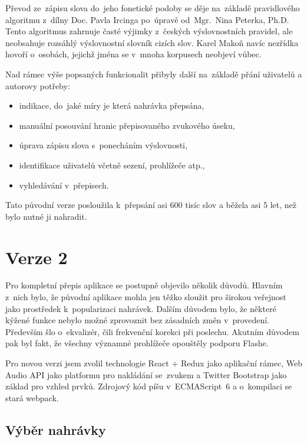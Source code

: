 Převod ze~zápisu slova do~jeho fonetické podoby se děje na~základě pravidlového
algoritmu z~dílny Doc. Pavla Ircinga po~úpravě od~Mgr.~Nina Peterka, Ph.D. Tento
algoritmus zahrnuje časté výjimky z~českých výslovnostních pravidel, ale
neobsahuje rozsáhlý výslovnostní slovník cizích slov. Karel Makoň navíc nezřídka
hovoří o~osobách, jejichž jména se v~mnoha korpusech neobjeví vůbec.

Nad rámec výše popsaných funkcionalit přibyly další na~základě přání uživatelů a
autorovy potřeby:

\begin{itemize}
\item{indikace, do~jaké míry je která nahrávka přepsána,}
\item{manuální posouvání hranic přepisovaného zvukového úseku,}
\item{úprava zápisu slova s~ponecháním výslovnosti,}
\item{identifikace uživatelů včetně sezení, prohlížeče atp.,}
\item{vyhledávání v~přepisech.}
\end{itemize}

Tato původní verze posloužila k~přepsání asi 600 tisíc slov a běžela asi 5 let,
než bylo nutné ji nahradit.

\section{Verze 2}

Pro kompletní přepis aplikace se postupně objevilo několik důvodů. Hlavním
z~nich bylo, že původní aplikace mohla jen těžko sloužit pro širokou veřejnost
jako prostředek k~popularizaci nahrávek. Dalším důvodem bylo, že některé kýžené
funkce nebylo možné zprovoznit bez zásadních změn v~provedení. Především šlo
o~ekvalizér, čili frekvenční korekci při poslechu. Akutním důvodem pak byl fakt,
že všechny významné prohlížeče opouštěly podporu Flashe.

Pro novou verzi jsem zvolil technologie React + Redux\cite{abramov2015redux} jako aplikační rámec, Web
Audio API\cite{adenot2013web} jako platformu pro nakládání se~zvukem a Twitter Bootstrap jako základ
pro vzhled prvků. Zdrojový kód píšu v~ECMAScript~6 a o~kompilaci se stará
webpack.

\subsection{Výběr nahrávky}

